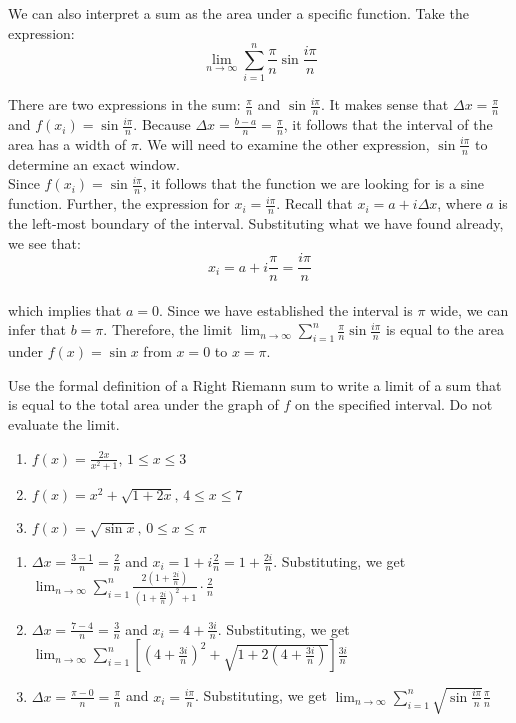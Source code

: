 We can also interpret a sum as the area under a specific function. Take the expression:\\
$$\lim_{n\to \infty} \sum_{i=1}^{n}\frac{\pi}{n}\sin{\frac{i\pi}{n}}$$

There are two expressions in the sum: $\frac{\pi}{n}$ and $\sin{\frac{i\pi}{n}}$. It makes sense that $\Delta x = \frac{\pi}{n}$ and $f(x_i)=\sin{\frac{i\pi}{n}}$. Because $\Delta x = \frac{b-a}{n}=\frac{\pi}{n}$, it follows that the interval of the area has a width of $\pi$. We will need to examine the other expression, $\sin{\frac{i\pi}{n}}$ to determine an exact window. \\

Since $f(x_i) = \sin{\frac{i\pi}{n}}$, it follows that the function we are looking for is a sine function. Further, the expression for $x_i = \frac{i\pi}{n}$. Recall that $x_i = a + i\Delta x$, where $a$ is the left-most boundary of the interval. Substituting what we have found already, we see that:\\
$$x_i=a+i\frac{\pi}{n} = \frac{i\pi}{n}$$\\
which implies that $a=0$. Since we have established the interval is $\pi$ wide, we can infer that $b=\pi$. Therefore, the limit $\lim_{n\to \infty}\sum_{i=1}^{n}\frac{\pi}{n}\sin{\frac{i\pi}{n}}$ is equal to the area under $f(x) = \sin{x}$ from $x=0$ to $x=\pi$. 

\begin{Exercise}[label=limsum1]
Use the formal definition of a Right Riemann sum to write a limit of a sum that is equal to the total area under the graph of $f$ on the specified interval. Do not evaluate the limit. 
\begin{enumerate}
\item $f(x) = \frac{2x}{x^2+1}\text{, } 1 \leq x \leq 3$
\item $f(x) = x^2+\sqrt{1+2x}\text{, } 4 \leq x \leq 7$
\item $f(x) = \sqrt{\sin{x}}\text{, } 0 \leq x \leq \pi$
\end{enumerate}
\end{Exercise}

\begin{Answer}[ref=limsum1]
\begin{enumerate}
\item $\Delta x = \frac{3-1}{n}=\frac{2}{n}$ and $x_i = 1+i\frac{2}{n}=1+\frac{2i}{n}$. Substituting, we get $\lim_{n\to\infty}\sum_{i=1}^{n}\frac{2(1+\frac{2i}{n})}{(1+\frac{2i}{n})^2+1} \cdot \frac{2}{n}$
\item $\Delta x = \frac{7-4}{n}=\frac{3}{n}$ and $x_i = 4+\frac{3i}{n}$. Substituting, we get $\lim_{n\to \infty}\sum_{i=1}^{n}[(4+\frac{3i}{n})^2+\sqrt{1+2(4+\frac{3i}{n})}]\frac{3i}{n}$
\item $\Delta x = \frac{\pi-0}{n}=\frac{\pi}{n}$ and $x_i = \frac{i\pi}{n}$. Substituting, we get $\lim_{n \to \infty}\sum_{i=1}^{n}\sqrt{\sin{\frac{i\pi}{n}}}\frac{\pi}{n}$
\end{enumerate}
\end{Answer}

